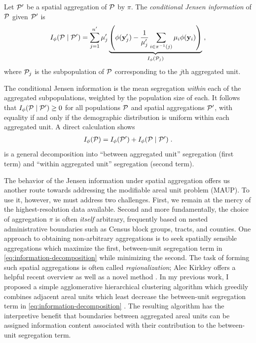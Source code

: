  \begin{dfn}
    Let $\mathcal{P}'$ be a spatial aggregation of $\mathcal{P}$ by $\pi$.
    The \emph{conditional Jensen information} of $\mathcal{P}$ given $\mathcal{P}'$ is 
    \begin{align*}
      I_{\phi}(\mathcal{P} \mid \mathcal{P}') = \sum_{j = 1}^{n'} \mu_j' \underbrace{\left( \phi(\mathbf{y}_j') - \frac{1}{\mu_j'}\sum_{i \in \pi^{-1}(j)} \mu_i \phi(\mathbf{y}_i) \right)}_{I_\phi(\mathcal{P}_j)}   \;, 
    \end{align*}
    where $\mathcal{P}_j$ is the subpopulation of $\mathcal{P}$ corresponding to the $j$th aggregated unit.
  \end{dfn}
  The conditional Jensen information is the mean segregation \emph{within} each of the aggregated subpopulations, weighted by the population size of each.
  It follows that $I_{\phi}(\mathcal{P} \mid \mathcal{P}') \geq 0$ for all populations $\mathcal{P}$ and spatial aggregations $\mathcal{P}'$, with equality if and only if the demographic distribution is uniform within each aggregated unit.
  A direct calculation shows 
  \begin{align}
    I_\phi(\mathcal{P}) = I_\phi(\mathcal{P}') + I_\phi(\mathcal{P} \mid \mathcal{P}') \;. \label{eq:information-decomposition}
  \end{align}
   is a general decomposition into ``between aggregated unit'' segregation (first term) and ``within aggregated unit'' segregation (second term).
  
  The behavior of the Jensen information under spatial aggregation offers us another route towards addressing the modifiable areal unit problem (MAUP). 
  To use it, however, we must address two challenges.
  First, we remain at the mercy of the highest-resolution data available. 
  Second and more fundamentally, the choice of aggregation $\pi$ is often \emph{itself} arbitrary, frequently based on nested administrative boundaries such as Census block groups, tracts, and counties.
  One approach to obtaining non-arbitrary aggregations is to seek spatially sensible aggregations which maximize the first, between-unit segregation term in \cref{eq:information-decomposition} while minimizing the second. 
  The task of forming such spatial aggregations is often called \emph{regionalization}; Alec Kirkley offers a helpful recent overview as well as a novel method \cite{kirkleySpatialRegionalizationBased2022}. 
  In my previous work, I proposed a simple agglomerative hierarchical clustering algorithm which greedily combines adjacent areal units which least decrease the between-unit segregation term in \cref{eq:information-decomposition} \cite{chodrowStructureInformationSpatial2017}.
  The resulting algorithm has the interpretive benefit that boundaries between aggregated areal units can be assigned information content associated with their contribution to the between-unit segregation term. 
  
